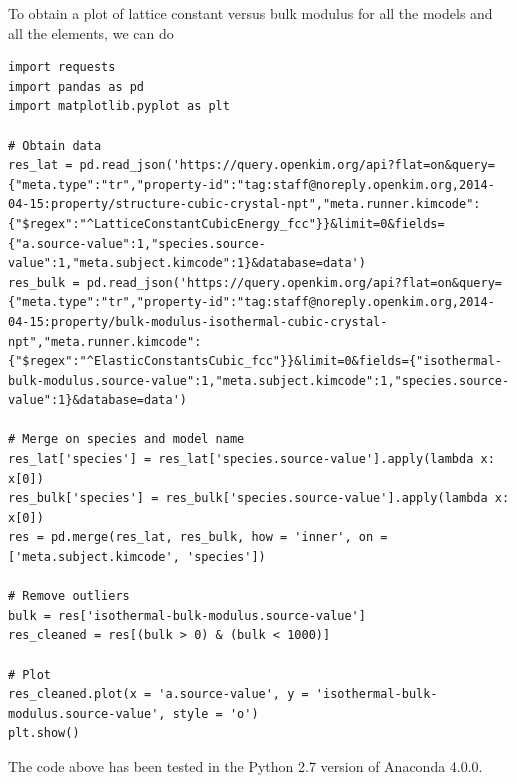 \documentclass[%
 reprint,
 amsmath,amssymb,
 aps,
]{revtex4-1}
\begin{document}
To obtain a plot of lattice constant versus bulk modulus for all the models and all the elements, we can do
\begin{lstlisting}
import requests
import pandas as pd
import matplotlib.pyplot as plt

# Obtain data
res_lat = pd.read_json('https://query.openkim.org/api?flat=on&query={"meta.type":"tr","property-id":"tag:staff@noreply.openkim.org,2014-04-15:property/structure-cubic-crystal-npt","meta.runner.kimcode":{"$regex":"^LatticeConstantCubicEnergy_fcc"}}&limit=0&fields={"a.source-value":1,"species.source-value":1,"meta.subject.kimcode":1}&database=data')
res_bulk = pd.read_json('https://query.openkim.org/api?flat=on&query={"meta.type":"tr","property-id":"tag:staff@noreply.openkim.org,2014-04-15:property/bulk-modulus-isothermal-cubic-crystal-npt","meta.runner.kimcode":{"$regex":"^ElasticConstantsCubic_fcc"}}&limit=0&fields={"isothermal-bulk-modulus.source-value":1,"meta.subject.kimcode":1,"species.source-value":1}&database=data')

# Merge on species and model name
res_lat['species'] = res_lat['species.source-value'].apply(lambda x: x[0])
res_bulk['species'] = res_bulk['species.source-value'].apply(lambda x: x[0])
res = pd.merge(res_lat, res_bulk, how = 'inner', on = ['meta.subject.kimcode', 'species'])

# Remove outliers
bulk = res['isothermal-bulk-modulus.source-value']
res_cleaned = res[(bulk > 0) & (bulk < 1000)]

# Plot
res_cleaned.plot(x = 'a.source-value', y = 'isothermal-bulk-modulus.source-value', style = 'o')
plt.show()
\end{lstlisting}
The code above has been tested in the Python 2.7 version of Anaconda 4.0.0.






\nocite{*}

\end{document}
